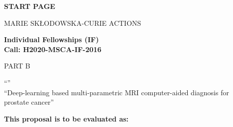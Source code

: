 \phantom{a}
\vspace{15mm}
\begin{center}


        \Large{


        \textbf{START PAGE}

          \vspace{15mm}
          MARIE SK\L{}ODOWSKA-CURIE ACTIONS\\
          \vspace{1cm}

          \textbf{Individual Fellowships (IF)}\\
          \textbf{Call: H2020-MSCA-IF-2016}
          \vspace{2cm}

          PART B
          \vspace{2.5cm}

          ``\proposalAcronym''\\
          \vspace{1cm}
          ``Deep-learning based multi-parametric MRI computer-aided diagnosis for prostate cancer''
          \vspace{1cm}

          \textbf{This proposal is to be evaluated as:}
          \vspace{.5cm}

          \textbf{\evaluationPannel}
        }

  \end{center}
\vspace{1cm}

